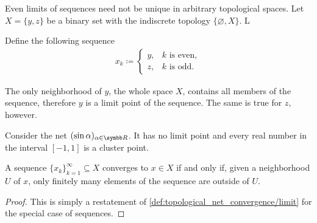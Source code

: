 \begin{example}\label{ex:multiple_limit_points_of_net}
  Even limits of sequences need not be unique in arbitrary topological spaces. Let \( X = \{ y, z \} \) be a binary set with the indiscrete topology \( \{ \varnothing, X \} \). L

  Define the following sequence
  \begin{align*}
    x_k \coloneqq \begin{cases}
      y, &k \text{ is even}, \\
      z, &k \text{ is odd}.
    \end{cases}
  \end{align*}

  The only neighborhood of \( y \), the whole space \( X \), contains all members of the sequence, therefore \( y \) is a limit point of the sequence. The same is true for \( z \), however.
\end{example}

\begin{example}\label{ex:cluster_points/sine}
  Consider the net \( ( \sin \al )_{\al \in \BR} \). It has no limit point and every real number in the interval \( [-1, 1] \) is a cluster point.
\end{example}

\begin{proposition}\label{thm:sequence_converges_iff_almost_entirely_in_neighborhood}
  A sequence \( \{ x_k \}_{k=1}^\infty \subseteq X \) converges to \( x \in X \) if and only if, given a neighborhood \( U \) of \( x \), only finitely many elements of the sequence are outside of \( U \).
\end{proposition}
\begin{proof}
  This is simply a restatement of \cref{def:topological_net_convergence/limit} for the special case of sequences.
\end{proof}

